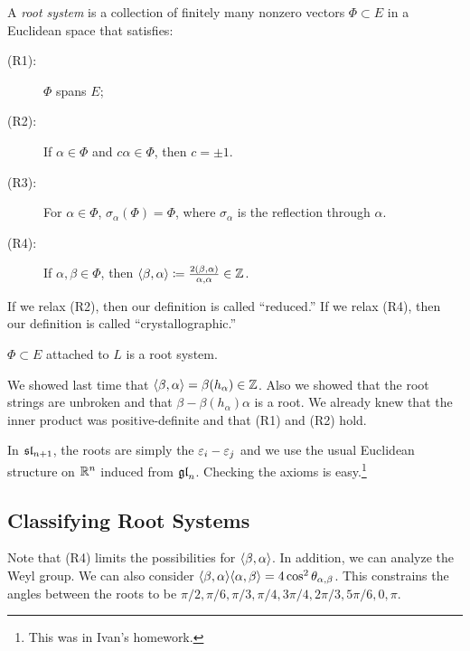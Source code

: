 \documentclass[twoside, 10pt]{article}
\begin{document}
    \begin{defn}
        A \textit{root system} is a collection of finitely many nonzero vectors $\Phi \subset E$ in a Euclidean space that satisfies:
        \begin{description}
            \item[(R1):] $\Phi$ spans $E$;
            \item[(R2):] If $\alpha \in \Phi$ and $c\alpha \in \Phi$, then $c = \pm 1$.
            \item[(R3):] For $\alpha \in \Phi$, $\sigma_{\alpha}(\Phi) = \Phi$, where $\sigma_{\alpha}$ is the reflection through $\alpha$.
            \item[(R4):] If $\alpha,\beta \in \Phi$, then $\langle\beta,\alpha\rangle \coloneqq \frac{2(\beta,\alpha)}{\alpha,\alpha} \in \mathbb{Z}$.
        \end{description}
    \end{defn}

    \begin{rmk}
        If we relax (R2), then our definition is called ``reduced.'' If we relax (R4), then our definition is called ``crystallographic.''
    \end{rmk}

    \begin{prop}
        $\Phi \subset E$ attached to $L$ is a root system.
    \end{prop}

    \begin{prop}
        We showed last time that $\langle\beta,\alpha\rangle = \beta(h_{\alpha}) \in \mathbb{Z}$. Also we showed that the root strings are unbroken and that $\beta - \beta(h_{\alpha})\alpha$ is a root. We already knew that the inner product was positive-definite and that (R1) and (R2) hold.
    \end{prop}

    \begin{exm}
        In $\mathfrak{sl}_{n+1}$, the roots are simply the $\varepsilon_i-\varepsilon_j$ and we use the usual Euclidean structure on $\mathbb{R}^n$ induced from $\mathfrak{gl}_n$. Checking the axioms is easy.\footnote{This was in Ivan's homework.}
    \end{exm}

    \subsection{Classifying Root Systems}%
    \label{sub:classifying_root_systems}
    
    Note that (R4) limits the possibilities for $\langle\beta,\alpha\rangle$. In addition, we can analyze the Weyl group. We can also consider $\langle\beta,\alpha\rangle\langle\alpha,\beta\rangle = 4 \cos^2 \theta_{\alpha,\beta}$. This constrains the angles between the roots to be $\pi/2, \pi/6, \pi/3, \pi/4, 3\pi/4, 2\pi/3, 5\pi/6, 0, \pi$. 
\end{document}
